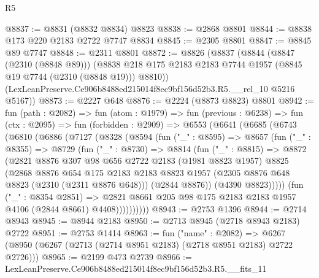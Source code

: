 \begin{lexlean}{R5}
\begin{coremodule}
@8837 := @8831 (@8832 @8834) @8823
@8838 := @2868 @8801
@8844 := @8838 @173 @220 @2183 @2722 @7747 @8834
@8845 := @2305 @8801
@8847 := @8845 @89 @7747
@8848 := @2311 @8801
@8872 := @8826
    (@8837
      (@8844
        (@8847 (@2310 (@8848 @89)))
        (@8838 @218 @175 @2183 @2183 @7744 @1957 (@8845 @19 @7744 (@2310 (@8848 @19))) @8810))
      (LexLeanPreserve.Ce906b8488ed215014f8ec9bf156d52b3.R5.__rel_10 @5216 @5167))
@8873 := @2227 @648
@8876 := @2224 (@8873 @8823) @8801
@8942 := fun (path : @2082) =>
  fun (atom : @1979) =>
  fun (previous : @6238) =>
  fun (ctx : @2095) =>
  fun (forbidden : @2909) =>
  @6553
    (@6641
      (@6685
        (@6743
          (@6810
            (@6886
              (@7127
                (@8328
                  (@8594
                    (fun ("_" : @8595) =>
                    @8657
                      (fun ("_" : @8355) =>
                      @8729
                        (fun ("_" : @8730) =>
                        @8814
                          (fun ("_" : @8815) =>
                          @8872
                            (@2821
                              @8876
                              @307
                              @98
                              @656
                              @2722
                              @2183
                              (@1981 @8823 @1957)
                              @8825
                              (@2868
                                @8876
                                @654
                                @175
                                @2183
                                @2183
                                @8823
                                @1957
                                (@2305 @8876 @648 @8823 (@2310 (@2311 @8876 @648)))
                                (@2844 @8876))
                              (@4390 @8823)))))
                      (fun ("_" : @8354 @2851) =>
                      @2821
                        @8661
                        @205
                        @98
                        @175
                        @2183
                        @2183
                        @1957
                        @4106
                        (@2844 @8661)
                        @4408))))))))))
@8943 := @2753 @1396
@8944 := @2714 @8943
@8945 := @8944 @2183
@8950 := @2713 @8945 (@2718 @8943 @2183) @2722
@8951 := @2753 @1414
@8963 := fun ("name" : @2082) =>
  @6267 (@8950 (@6267 (@2713 (@2714 @8951 @2183) (@2718 @8951 @2183) @2722 @2726)))
@8965 := @2199 @473 @2739
@8966 := LexLeanPreserve.Ce906b8488ed215014f8ec9bf156d52b3.R5.__fits_11

\end{coremodule}
\end{lexlean}
